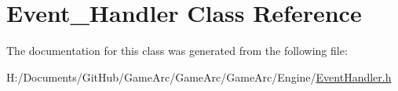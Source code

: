 \hypertarget{class_event___handler}{\section{Event\+\_\+\+Handler Class Reference}
\label{class_event___handler}
}


The documentation for this class was generated from the following file\+:\begin{DoxyCompactItemize}
\item 
H\+:/\+Documents/\+Git\+Hub/\+Game\+Arc/\+Game\+Arc/\+Game\+Arc/\+Engine/\hyperlink{_event_handler_8h}{Event\+Handler.\+h}\end{DoxyCompactItemize}
